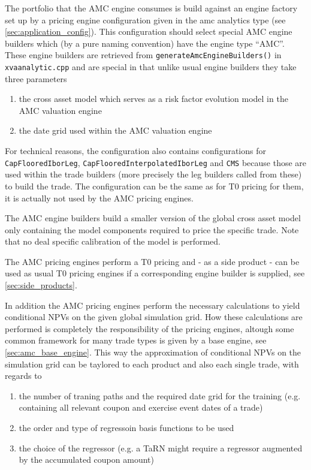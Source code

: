 \documentclass[12pt, a4paper]{article}
\begin{document}
The portfolio that the AMC engine consumes is build against an engine factory set up by a pricing engine configuration
given in the amc analytics type (see \ref{sec:application_config}). This configuration should select special AMC engine
builders which (by a pure naming convention) have the engine type ``AMC''. These engine builders are retrieved from
\verb+generateAmcEngineBuilders()+ in \verb+xvaanalytic.cpp+ and are special in that unlike usual engine builders they
take three parameters

\begin{enumerate}
\item the cross asset model which serves as a risk factor evolution model in the AMC valuation engine
\item the date grid used within the AMC valuation engine
\end{enumerate}

For technical reasons, the configuration also contains configurations for \\ \verb+CapFlooredIborLeg+,
\verb+CapFlooredInterpolatedIborLeg+ and \verb+CMS+
because those are used within the trade builders (more precisely the leg builders called from these) to build the
trade. The configuration can be the same as for T0 pricing for them, it is actually not used by the AMC pricing engines.

The AMC engine builders build a smaller version of the global cross asset model only containing the model components
required to price the specific trade. Note that no deal specific calibration of the model is performed.

The AMC pricing engines perform a T0 pricing and - as a side product - can be used as usual T0 pricing engines if a
corresponding engine builder is supplied, see \ref{sec:side_products}.

In addition the AMC pricing engines perform the necessary calculations to yield conditional NPVs on the given global
simulation grid. How these calculations are performed is completely the responsibility of the pricing engines, altough
some common framework for many trade types is given by a base engine, see \ref{sec:amc_base_engine}. This way the
approximation of conditional NPVs on the simulation grid can be taylored to each product and also each single trade,
with regards to

\begin{enumerate}
\item the number of traning paths and the required date grid for the training (e.g. containing all relevant coupon and
  exercise event dates of a trade)
\item the order and type of regressoin basis functions to be used
\item the choice of the regressor (e.g. a TaRN might require a regressor augmented by the accumulated coupon amount)
\end{enumerate}
\end{document}
